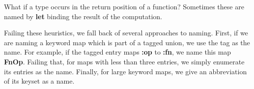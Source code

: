 What if a type occurs in the return position of a function?
Sometimes these are named by \textbf{let} binding the result
of the computation.

Failing these heuristics, we fall back of several approaches
to naming.
First, if we are naming a keyword map which is part of a tagged
union, we use the tag as the name. For example, if the tagged entry
maps \textbf{:op} to \textbf{:fn}, we name this map \textbf{FnOp}.
Failing that, for maps with less than three entries, we simply
enumerate its entries as the name.
Finally, for large keyword maps, we give an abbreviation
of its keyset as a name.

%


